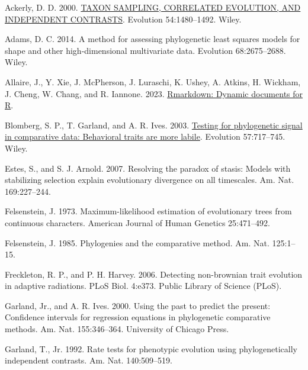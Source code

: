 \documentclass[fleqn,10pt,lineno]{wlpeerj} %
\newlength{\cslhangindent}
\newenvironment{CSLReferences}[2] %
 {\begin{list}{}{%
  \setlength{\itemindent}{0pt}
  \setlength{\leftmargin}{0pt}
  \setlength{\parsep}{0pt}
  \ifodd #1
   \setlength{\leftmargin}{\cslhangindent}
   \setlength{\itemindent}{-1\cslhangindent}
  \fi
  \setlength{\itemsep}{#2\baselineskip}}}
 {\end{list}}
\begin{document}
\label{refs}
\begin{CSLReferences}{1}{0}
Ackerly, D. D. 2000. \href{https://doi.org/10.1111/j.0014-3820.2000.tb00694.x}{TAXON SAMPLING, CORRELATED EVOLUTION, AND INDEPENDENT CONTRASTS}. Evolution 54:1480--1492. Wiley.

Adams, D. C. 2014. A method for assessing phylogenetic least squares models for shape and other high-dimensional multivariate data. Evolution 68:2675--2688. Wiley.

Allaire, J., Y. Xie, J. McPherson, J. Luraschi, K. Ushey, A. Atkins, H. Wickham, J. Cheng, W. Chang, and R. Iannone. 2023. \href{https://github.com/rstudio/rmarkdown}{{R}markdown: Dynamic documents for {R}}.

Blomberg, S. P., T. Garland, and A. R. Ives. 2003. \href{https://doi.org/10.1111/j.0014-3820.2003.tb00285.x}{Testing for phylogenetic signal in comparative data: Behavioral traits are more labile}. Evolution 57:717--745. Wiley.

Estes, S., and S. J. Arnold. 2007. Resolving the paradox of stasis: Models with stabilizing selection explain evolutionary divergence on all timescales. Am. Nat. 169:227--244.

Felsenstein, J. 1973. Maximum-likelihood estimation of evolutionary trees from continuous characters. American Journal of Human Genetics 25:471--492.

Felsenstein, J. 1985. Phylogenies and the comparative method. Am. Nat. 125:1--15.

Freckleton, R. P., and P. H. Harvey. 2006. Detecting non-brownian trait evolution in adaptive radiations. PLoS Biol. 4:e373. Public Library of Science (PLoS).

Garland, Jr., and A. R. Ives. 2000. Using the past to predict the present: Confidence intervals for regression equations in phylogenetic comparative methods. Am. Nat. 155:346--364. University of Chicago Press.

Garland, T., Jr. 1992. Rate tests for phenotypic evolution using phylogenetically independent contrasts. Am. Nat. 140:509--519.


\end{CSLReferences}
\end{document}
